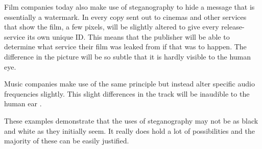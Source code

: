 Film companies today also make use of steganography to hide a message that is essentially a watermark.
In every copy sent out to cinemas and other services that show the film, a few pixels, will be slightly altered to give every release-service its own unique ID.
This means that the publisher will be able to determine what service their film was leaked from if that was to happen.
The difference in the picture will be so subtle that it is hardly visible to the human eye.

Music companies make use of the same principle but instead alter specific audio frequencies slightly.
This slight differences in the track will be inaudible to the human ear \citep{Anderson1998}.

These examples demonstrate that the uses of steganography may not be as black and white as they initially seem.
It really does hold a lot of possibilities and the majority of these can be easily justified.